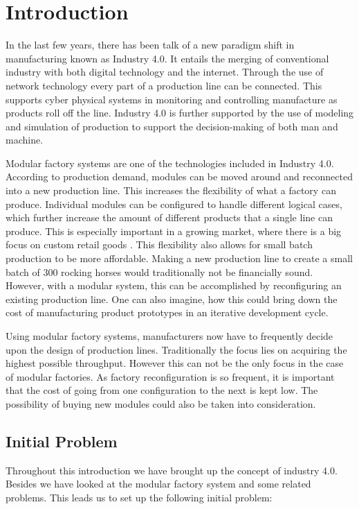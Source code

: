 \chapter{Introduction}
\label{ch:introduction}

In the last few years, there has been talk of a new paradigm shift in manufacturing known as Industry 4.0. It entails the merging of conventional industry with both digital technology and the internet. Through the use of network technology every part of a production line can be connected. This supports cyber physical systems in monitoring and controlling manufacture as products roll off the line. Industry 4.0 is further supported by the use of modeling and simulation of production to support the decision-making of both man and machine. \cite{Davis2015}

Modular factory systems are one of the technologies included in Industry 4.0. According to production demand, modules can be moved around and reconnected into a new production line. This increases the flexibility of what a factory can produce. Individual modules can be configured to handle different logical cases, which further increase the amount of different products that a single line can produce. This is especially important in a growing market, where there is a big focus on custom retail goods \cite{Spaulding2013}.  This flexibility also allows for small batch production to be more affordable.  Making a new production line to create a small batch of 300 rocking horses would traditionally not be financially sound. However, with a modular system, this can be accomplished by reconfiguring an existing production line. One can also imagine, how this could bring down the cost of manufacturing product prototypes in an iterative development cycle.

Using modular factory systems, manufacturers now have to frequently decide upon the design of production lines. Traditionally the focus lies on acquiring the highest possible throughput. However this can not be the only focus in the case of modular factories. As factory reconfiguration is so frequent, it is important that the cost of going from one configuration to the next is kept low. The possibility of buying new modules could also be taken into consideration. 

\section{Initial Problem}

Throughout this introduction we have brought up the concept of industry 4.0. Besides we have looked at the modular factory system and some related problems. This leads us to set up the following initial problem:

